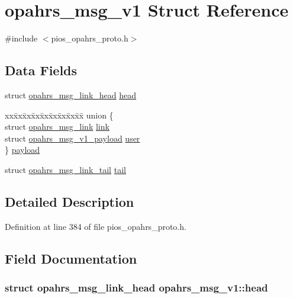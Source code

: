 \hypertarget{structopahrs__msg__v1}{\section{opahrs\-\_\-msg\-\_\-v1 Struct Reference}
\label{structopahrs__msg__v1}
}


{\ttfamily \#include $<$pios\-\_\-opahrs\-\_\-proto.\-h$>$}

\subsection*{Data Fields}
\begin{DoxyCompactItemize}
\item 
struct \hyperlink{structopahrs__msg__link__head}{opahrs\-\_\-msg\-\_\-link\-\_\-head} \hyperlink{structopahrs__msg__v1_a93c4ecd3a3469bd4d34f3fa5852e4f63}{head}
\item 
\begin{tabbing}
xx\=xx\=xx\=xx\=xx\=xx\=xx\=xx\=xx\=\kill
union \{\\
\>struct \hyperlink{structopahrs__msg__link}{opahrs\_msg\_link} \hyperlink{structopahrs__msg__v1_a0fbede654e43c8c3291a531f19b8cb92}{link}\\
\>struct \hyperlink{structopahrs__msg__v1__payload}{opahrs\_msg\_v1\_payload} \hyperlink{structopahrs__msg__v1_aaaa1d2189da75e6b6ba29e1ac7f94c27}{user}\\
\} \hyperlink{structopahrs__msg__v1_a34206550b5d8d586efe708b33f143418}{payload}\\

\end{tabbing}\item 
struct \hyperlink{structopahrs__msg__link__tail}{opahrs\-\_\-msg\-\_\-link\-\_\-tail} \hyperlink{structopahrs__msg__v1_a380eead781498e5b770b8981e85eb650}{tail}
\end{DoxyCompactItemize}


\subsection{Detailed Description}


Definition at line 384 of file pios\-\_\-opahrs\-\_\-proto.\-h.



\subsection{Field Documentation}
\hypertarget{structopahrs__msg__v1_a93c4ecd3a3469bd4d34f3fa5852e4f63}{
\subsubsection[{head}]{\setlength{\rightskip}{0pt plus 5cm}struct {\bf opahrs\-\_\-msg\-\_\-link\-\_\-head} opahrs\-\_\-msg\-\_\-v1\-::head}}\label{structopahrs__msg__v1_a93c4ecd3a3469bd4d34f3fa5852e4f63}


